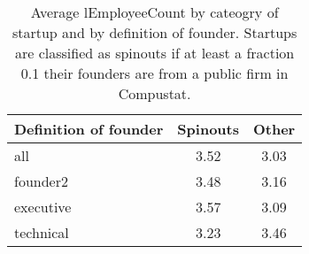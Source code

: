 \begin{table}[!htb]
\centering
\begingroup\small
\begin{tabular}{p{1.5cm}cc}
  \toprule
Definition of founder & Spinouts & Other \\ 
  \midrule
all & 3.52 & 3.03 \\ 
  founder2 & 3.48 & 3.16 \\ 
  executive & 3.57 & 3.09 \\ 
  technical & 3.23 & 3.46 \\ 
   \bottomrule
\end{tabular}
\endgroup
\caption{Average lEmployeeCount by cateogry of startup and by definition of founder. Startups are classified as spinouts if at least a fraction 0.1 their founders are from a public firm in Compustat.} 
\label{table:raw_comparison_lEmployeeCount}
\end{table}
